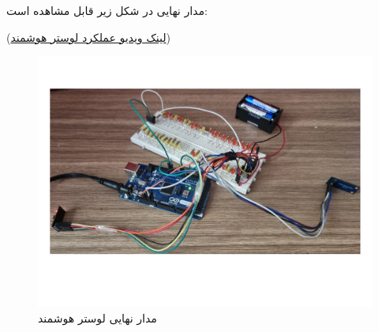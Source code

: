 \documentclass[12pt,a4paper]{article}
\begin{document}
مدار نهایی در شکل زیر قابل مشاهده است:

(\href{https://mega.nz/file/sV8AgRSR#gpizWW71jrvvycUeRTwPTCkDCR79WKKiugmJP3BU1oc}{لینک ویدیو عملکرد لوستر هوشمند})

		\begin{figure}[H]
		\centering
		\includegraphics[scale=0.3]{figs/final.png}
		\caption{
			مدار نهایی لوستر هوشمند
		}
		\label{fig:schema14}
	\end{figure}
\end{document}
